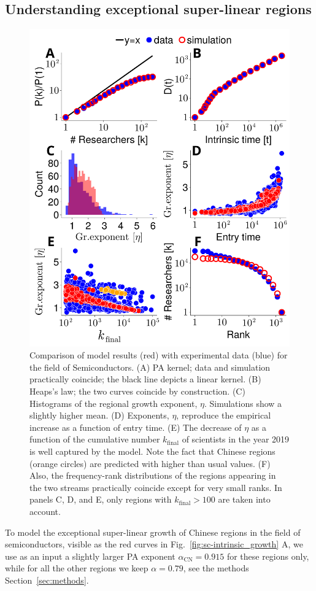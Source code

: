 \documentclass[draft,final]{vutinfth} %
\begin{document}
\subsection{Understanding exceptional super-linear regions}
\begin{figure}[!ht]
    \centering
\includegraphics[width=0.7\linewidth]{figures_csf/fig4.pdf}
    \caption{Comparison of model results (red) with experimental data  (blue) for the field of Semiconductors.
    (A) PA kernel; data and simulation practically coincide; the black line depicts a linear kernel.
    (B) Heaps's law; the two curves coincide by construction.
    (C) Histograms of the regional growth exponent, $\eta$. Simulations show a slightly higher mean. 
    (D) Exponents, $\eta$, reproduce the empirical increase as a function of entry time.
    (E) The decrease of $\eta$ as a function of the cumulative number $k_\mathrm{final}$ of scientists in the year 2019 is well captured by the model. Note the fact that Chinese regions (orange circles) are predicted with higher than usual values.
    (F) Also, the frequency-rank distributions of the regions appearing in the two streams practically coincide except for very small ranks.
    In panels C, D, and E, only regions with $k_\mathrm{final}>100$ are taken into account.
    }
    \label{fig:sc-model}
\end{figure}
To model the exceptional super-linear growth of Chinese regions in the field of semiconductors, visible as the red curves in Fig.~\ref{fig:sc-intrinsic_growth} A, we use as an input a slightly larger PA exponent $\alpha_\mathrm{CN}=0.915$ for these regions only, while for all the other regions we keep $\alpha=0.79$, see the methods Section~\ref{sec:methods}.
\end{document}
